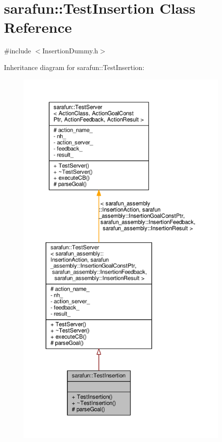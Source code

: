\hypertarget{classsarafun_1_1TestInsertion}{\section{sarafun\-:\-:Test\-Insertion Class Reference}
\label{classsarafun_1_1TestInsertion}
}


{\ttfamily \#include $<$Insertion\-Dummy.\-h$>$}



Inheritance diagram for sarafun\-:\-:Test\-Insertion\-:\nopagebreak
\begin{figure}[H]
\begin{center}
\leavevmode
\includegraphics[height=550pt]{d8/d44/classsarafun_1_1TestInsertion__inherit__graph}
\end{center}
\end{figure}


